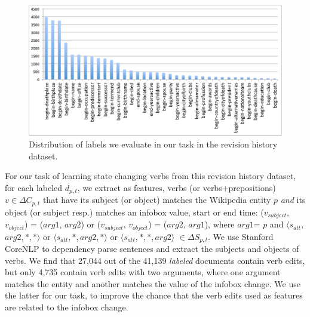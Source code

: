 \begin{figure}[t]
\begin{center}
\includegraphics[width=15cm,keepaspectratio=true]{figures/distribution.pdf}
\caption{\label{fig:distribution} Distribution of labels we evaluate in our task in the revision history dataset.}
\end{center}
\end{figure}

For our task of learning state changing verbs from this revision history dataset, for each labeled $d_{p,t}$, we extract as features, verbs (or verbs+prepositions) $v \in \Delta C_{p, t}$ that have its subject (or object) matches the Wikipedia entity $p$ \textit{and} its object (or subject resp.) matches an infobox value, start or end time: ($v_{subject}$, $v_{object}$) = (\scriptsize$arg1$\normalsize, \scriptsize$arg2$\normalsize) or ($v_{subject}$, $v_{object}$) = (\scriptsize$arg2$\normalsize,  \scriptsize$arg1$\normalsize), where \scriptsize$arg1$\normalsize = $p$ and $\langle s_{att}, $\scriptsize$arg2$\normalsize$, *, *\rangle$ or $\langle s_{att}, *, $\scriptsize$arg2$\normalsize$, *\rangle$ or $\langle s_{att}, *, *, $\scriptsize$arg2$\normalsize$\rangle$ $\in \Delta S_{p, t}$. We use Stanford CoreNLP \cite{manning-EtAl:2014:P14-5} to dependency parse sentences and extract the subjects and objects of verbs. We find that 27,044 out of the 41,139 \textit{labeled} documents contain verb edits, but only 4,735 contain verb edits with two arguments, where one argument matches the entity and another matches the value of the infobox change. We use the latter for our task, to improve the chance that the verb edits used as features are related to the infobox change. 


